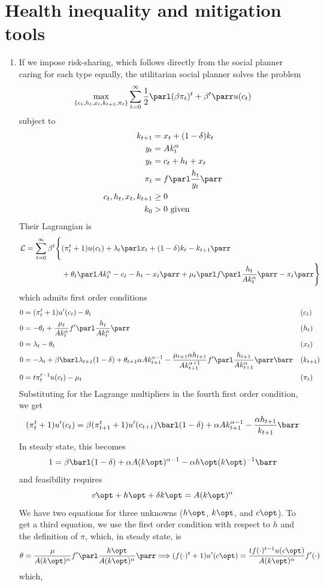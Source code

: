 \documentclass[10pt]{article}
\begin{document}
\maketitle

\section*{Health inequality and mitigation tools}


\begin{enumerate}
	\item If we impose risk-sharing, which follows directly from the social planner caring for each type equally, the utilitarian social planner solves the problem \[\max_{\{c_t,h_t,x_t,k_{t+1},\pi_t\}} \sum_{t=0}^\infty \frac{1}{2}\parl (\beta \pi_t)^t + \beta^t\parr u(c_t)\]subject to \begin{align*} k_{t+1} &= x_t + (1-\delta)k_t \\ y_t &= Ak_t^\alpha \\ y_t &= c_t + h_t + x_t \\ \pi_t &= f\parl \frac{h_t}{y_t}\parr \\ c_t,h_t,x_t,k_{t+1} &\ge 0 \\ k_0 &> 0 \text{ given} \end{align*}Their Lagrangian is \begin{align*}\mathcal{L} = \sum_{t=0}^\infty \beta^t \Bigg\{ &(\pi_t^t + 1)u(c_t) + \lambda_t \parl x_t + (1-\delta)k_t - k_{t+1} \parr \\ &+ \theta_t \parl A k_t^\alpha - c_t - h_t - x_t\parr + \mu_t\parl f\parl \frac{h_t}{Ak_t^\alpha}\parr - \pi_t\parr \Bigg\}\end{align*}which admits first order conditions\begin{align*} 0 &= (\pi^t_t + 1)u'(c_t) - \theta_t &&(c_t) \\ 0 &= -\theta_t + \frac{\mu_t}{Ak_t^\alpha} f'\parl \frac{h_t}{Ak_t^\alpha}\parr &&(h_t) \\ 0 &= \lambda_t - \theta_t &&(x_t) \\ 0 &= -\lambda_t + \beta \barl \lambda_{t+1}(1-\delta) + \theta_{t+1}\alpha Ak_{t+1}^{\alpha-1} - \frac{\mu_{t+1} \alpha h_{t+1}}{Ak_{t+1}^{\alpha + 1}} f'\parl \frac{h_{t+1}}{Ak_{t+1}^\alpha}\parr\barr &&(k_{t+1}) \\ 0 &= t\pi^{t-1}_t u(c_t) - \mu_t &&(\pi_t) \end{align*}Substituting for the Lagrange multipliers in the fourth first order condition, we get \[(\pi_t^t + 1)u'(c_t) = \beta (\pi_{t+1}^t + 1)u'(c_{t+1})\barl (1-\delta) + \alpha Ak_{t+1}^{\alpha - 1} - \frac{\alpha h_{t+1}}{k_{t+1}}\barr\]In steady state, this becomes\[1 = \beta \barl (1-\delta) + \alpha A (k\opt)^{\alpha-1} - \alpha h\opt (k\opt)^{-1}\barr\]and feasibility requires \[c\opt + h\opt + \delta k\opt = A(k\opt)^\alpha \]We have two equations for three unknowns ($h\opt$, $k\opt$, and $c\opt$). To get a third equation, we use the first order condition with respect to $h$ and the definition of $\pi$, which, in steady state, is\[\theta = \frac{\mu}{A (k\opt)^\alpha} f'\parl \frac{h\opt}{A (k\opt)^\alpha}\parr \Longrightarrow (f(\cdot)^t + 1)u'(c\opt) = \frac{tf(\cdot)^{t-1}u(c\opt)}{A (k\opt)^\alpha}f'(\cdot)\]which, 
\end{enumerate}
\end{document}
